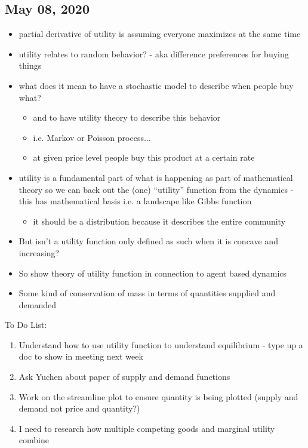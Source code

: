\subsection{May 08, 2020}
\begin{itemize}\compresslist
	\item partial derivative of utility is assuming everyone maximizes at the same time
	\item utility relates to random behavior? - aka difference preferences for buying things
	\item what does it mean to have a stochastic model to describe when people buy what?
	\begin{itemize}\compresslist
		\item and to have utility theory to describe this behavior
		\item i.e. Markov or Poisson process...
		\item at given price level people buy this product at a certain rate
	\end{itemize}
	\item utility is a fundamental part of what is happening as part of mathematical theory
so we can back out the (one) ``utility'' function from the dynamics - this has mathematical basis i.e. a landscape like Gibbs function
	\begin{itemize}\compresslist
		\item it should be a distribution because it describes the entire community
	\end{itemize}
		\item But isn't a utility function only defined as such when it is concave and increasing?
		\item So show theory of utility function in connection to agent based dynamics
		\item Some kind of conservation of mass in terms of quantities supplied and demanded
\end{itemize}

To Do List:
\begin{enumerate}
	\item Understand how to use utility function to understand equilibrium - type up a doc to show in meeting next week
	\item Ask Yuchen about paper of supply and demand functions
	\item Work on the streamline plot to ensure quantity is being plotted (supply and demand not price and quantity?)
	\item I need to research how multiple competing goods and marginal utility combine
\end{enumerate}	




